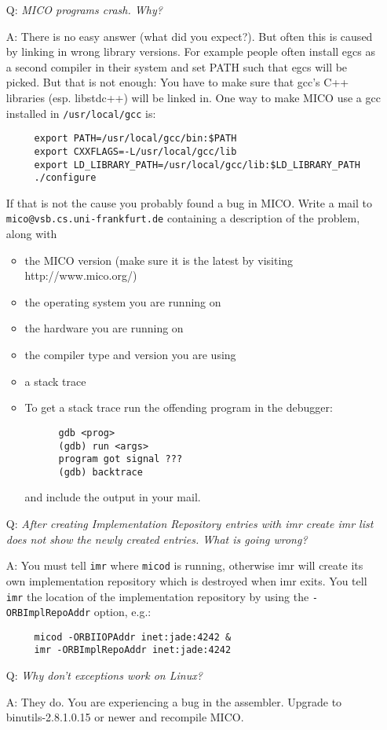 \begin{itemize}
\item[Q:] \emph{MICO programs crash. Why?}
  
\item[A:] There is no easy answer (what did you expect?). But often
  this is caused by linking in wrong library versions. For example
  people often install egcs as a second compiler in their system and
  set PATH such that egcs will be picked. But that is not enough: You
  have to make sure that gcc's C++ libraries (esp. libstdc++) will be
  linked in. One way to make MICO use a gcc installed in
  \texttt{/usr/local/gcc} is:

  \begin{verbatim}
     export PATH=/usr/local/gcc/bin:$PATH
     export CXXFLAGS=-L/usr/local/gcc/lib
     export LD_LIBRARY_PATH=/usr/local/gcc/lib:$LD_LIBRARY_PATH
     ./configure
  \end{verbatim}
  
  If that is not the cause you probably found a bug in MICO. Write a
  mail to \texttt{mico@vsb.cs.uni-frankfurt.de} containing a
  description of the problem, along with

  \begin{itemize}
  \item the MICO version (make sure it is the latest by visiting
       http://www.mico.org/)
  \item the operating system you are running on
  \item the hardware you are running on
  \item the compiler type and version you are using
  \item a stack trace
  \item To get a stack trace run the offending program in the
    debugger:
    \begin{verbatim}
      gdb <prog>
      (gdb) run <args>
      program got signal ???
      (gdb) backtrace
    \end{verbatim}
    and include the output in your mail.
  \end{itemize}
\end{itemize}

\begin{itemize}
\item[Q:] \emph{After creating Implementation Repository entries with
    imr create imr list does not show the newly created entries. What
    is going wrong?}
  
\item[A:] You must tell \texttt{imr} where \texttt{micod} is running,
  otherwise imr will create its own implementation repository which is
  destroyed when imr exits. You tell \texttt{imr} the location of the
  implementation repository by using the \texttt{-ORBImplRepoAddr}
  option, e.g.:
  \begin{verbatim}
     micod -ORBIIOPAddr inet:jade:4242 &
     imr -ORBImplRepoAddr inet:jade:4242
  \end{verbatim}
\end{itemize}

\begin{itemize}
\item[Q:] \emph{Why don't exceptions work on Linux?}
\item[A:] They do. You are experiencing a bug in the
  assembler. Upgrade to binutils-2.8.1.0.15 or newer and recompile
  MICO.
\end{itemize}
